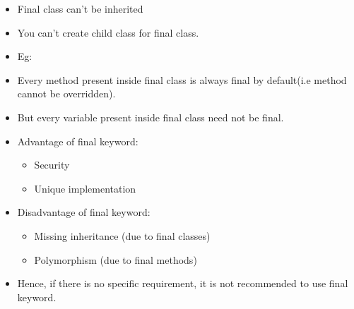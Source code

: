 \setlength{\columnsep}{3pt}
\begin{flushleft}

	\begin{itemize}
		\item Final class can’t be inherited 
		\item You can’t create child class for final class.
		\item Eg:
		\bigskip
		\item Every method present inside final class is always final by default(i.e method cannot be overridden).
		\item But every variable present inside final class need not be final.
		
		\item Advantage of final keyword:
		\begin{itemize}
			\item Security
			\item Unique implementation
		\end{itemize}
	
		\item Disadvantage of final keyword:
		\begin{itemize}
			\item Missing inheritance (due to final classes)
			\item Polymorphism (due to final methods)
		\end{itemize}
		
		\item Hence, if there is no specific requirement, it is not recommended to use final keyword.
		
		
	\end{itemize}	
	
\end{flushleft}

\newpage

